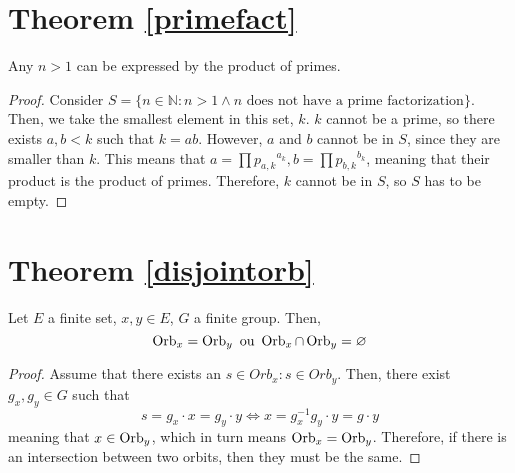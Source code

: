\section{Theorem \ref{primefact}}
\begin{theorem*}
  Any $n > 1$ can be expressed by the product of primes.
\end{theorem*}
\begin{proof}
  Consider $S = \{n \in \mathbb{N}: n > 1 \land n \text{ does not have a prime factorization}\}$. Then, we take the smallest element in this set, $k$. $k$ cannot be a prime, so there exists $a, b < k$ such that $k = ab$. However, $a$ and $b$ cannot be in $S$, since they are smaller than $k$. This means that $a = \prod {p_{a,k}}^{a_k}, b = \prod {p_{b, k}}^{b_k}$, meaning that their product is the product of primes. Therefore, $k$ cannot be in $S$, so $S$ has to be empty.
\end{proof}

\section{Theorem \ref{disjointorb}}
\begin{theorem*}
  Let $E$ a finite set, $x, y \in E$, $G$ a finite group. Then, 
  \[
    \operatorname{Orb}_x = \operatorname{Orb}_y \text{ ou } \operatorname{Orb}_x \cap \operatorname{Orb}_y = \varnothing
  \]
\end{theorem*}
\begin{proof}
  Assume that there exists an $s \in Orb_x : s \in Orb_y$. Then, there exist $g_x, g_y \in G$ such that
  \[
    s = g_x \cdot x = g_y \cdot y \Leftrightarrow x = g_x^{-1}g_y \cdot y = g \cdot y
  \]
  meaning that $x \in \operatorname{Orb}_y$, which in turn means $\operatorname{Orb}_x = \operatorname{Orb}_y$. Therefore, if there is an intersection between two orbits, then they must be the same. 
\end{proof}